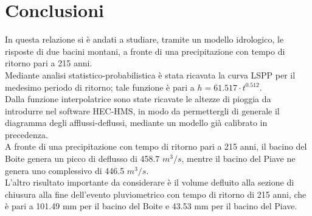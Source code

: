 \section{Conclusioni}
In questa relazione si è andati a studiare, tramite un modello idrologico, le risposte di due bacini montani, a fronte di una precipitazione con tempo di ritorno pari a 215 anni.\\
Mediante analisi statistico-probabilistica è stata ricavata la curva LSPP per il medesimo periodo di ritorno; tale funzione è pari a $h=61.517 \cdot t ^{0.512}$.\\
Dalla funzione interpolatrice sono state ricavate le altezze di pioggia da introdurre nel software HEC-HMS, in modo da permettergli di generale il diagramma degli afflussi-deflussi, mediante un modello già calibrato in precedenza.\\
A fronte di una precipitazione con tempo di ritorno pari a 215 anni, il bacino del Boite genera un picco di deflusso di 458.7 $m^3/s$, mentre il bacino del Piave ne genera uno complessivo di 446.5 $m^3/s$.\\
L'altro risultato importante da considerare è il volume defluito alla sezione di chiusura alla fine dell'evento pluviometrico con tempo di ritorno di 215 anni, che è pari a 101.49 mm per il bacino del Boite e 43.53 mm per il bacino del Piave.